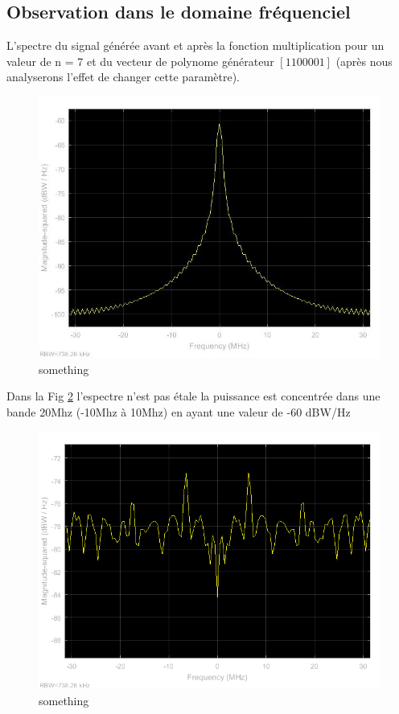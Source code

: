 \documentclass{report}
\begin{document}
\subsection{Observation dans le domaine fréquenciel}

L'spectre du signal générée avant et après la fonction multiplication pour un valeur de n = 7 et du vecteur de 
polynome générateur $ [1 1 0 0 0 0 1] $ (après nous analyserons l'effet de changer cette paramètre).\\


\begin{figure}[h]
	\centering
	\includegraphics[width=0.7\linewidth]{cdma_2_jpg}
	\caption{something}
	\label{fig:cdma2jpg}
\end{figure}



Dans la Fig \ref{fig:cdma1jpg} l'espectre n'est pas étale la puissance est concentrée dans une bande 20Mhz (-10Mhz à 10Mhz) en ayant une valeur de -60 dBW/Hz

\begin{figure}[h]
	\centering
	\includegraphics[width=0.6\linewidth]{cdma_1_jpg}
	\caption{something}
	\label{fig:cdma1jpg}
\end{figure}
\end{document}
